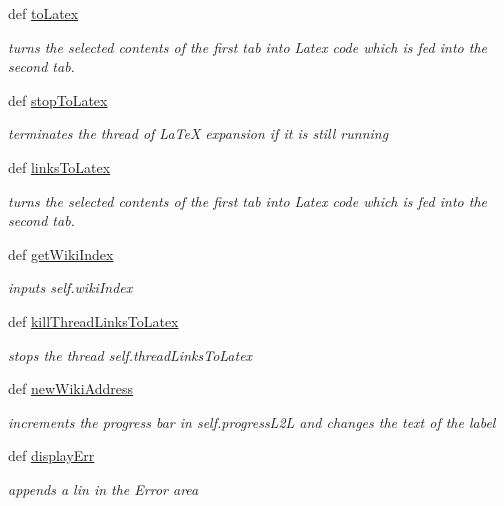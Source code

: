 \begin{DoxyCompactItemize}
def \hyperlink{classuicilibris_1_1w2mMainWindow_a2572ed1ecb17d7984699be7fd2b4c16f}{to\-Latex}
\begin{DoxyCompactList}\small\item\em turns the selected contents of the first tab into \-Latex code which is fed into the second tab. \end{DoxyCompactList}\item 
def \hyperlink{classuicilibris_1_1w2mMainWindow_afcd6b1cbd2e3c7c49c3eb218e63d74fb}{stop\-To\-Latex}
\begin{DoxyCompactList}\small\item\em terminates the thread of \-La\-Te\-X expansion if it is still running \end{DoxyCompactList}\item 
def \hyperlink{classuicilibris_1_1w2mMainWindow_a1cfdfd4a9daf1a27d3d7f29cacb9f757}{links\-To\-Latex}
\begin{DoxyCompactList}\small\item\em turns the selected contents of the first tab into \-Latex code which is fed into the second tab. \end{DoxyCompactList}\item 
def \hyperlink{classuicilibris_1_1w2mMainWindow_a6717d417cd86ab78b4428a14b5ad4b0c}{get\-Wiki\-Index}
\begin{DoxyCompactList}\small\item\em inputs self.\-wiki\-Index \end{DoxyCompactList}\item 
def \hyperlink{classuicilibris_1_1w2mMainWindow_a3b1c79851802ee6bf2d49d77f779039f}{kill\-Thread\-Links\-To\-Latex}
\begin{DoxyCompactList}\small\item\em stops the thread self.\-thread\-Links\-To\-Latex \end{DoxyCompactList}\item 
def \hyperlink{classuicilibris_1_1w2mMainWindow_a1be02f4f12b50e5ebcd6ecc8f4d9a532}{new\-Wiki\-Address}
\begin{DoxyCompactList}\small\item\em increments the progress bar in self.\-progress\-L2\-L and changes the text of the label \end{DoxyCompactList}\item 
def \hyperlink{classuicilibris_1_1w2mMainWindow_a4f683d705e901227efacd4d3b59da2d7}{display\-Err}
\begin{DoxyCompactList}\small\item\em appends a lin in the \-Error area \end{DoxyCompactList}\item 

\end{DoxyCompactItemize}
